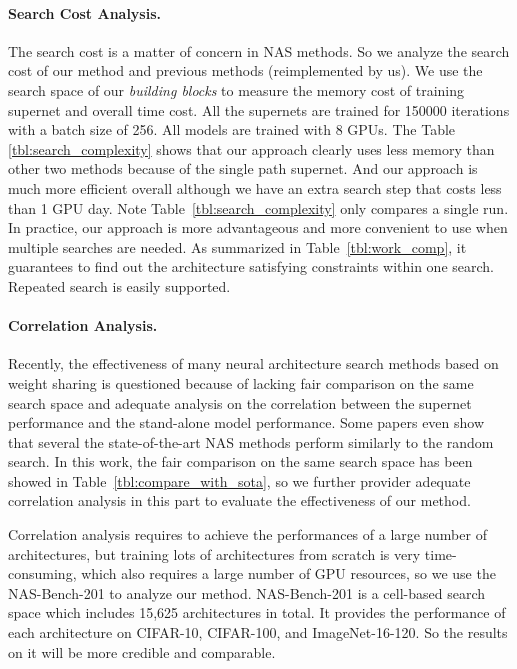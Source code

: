 \paragraph{Search Cost Analysis. } The search cost is a matter of concern in NAS methods. So we analyze the search cost of our method and previous methods \cite{wu2018fbnet,cai2018proxylessnas} (reimplemented by us). We use the search space of our \emph{building blocks} to measure the memory cost of training supernet and overall time cost. All the supernets are trained for 150000 iterations with a batch size of 256. All models are trained with 8 GPUs. The Table \ref{tbl:search_complexity} shows that our approach clearly uses less memory than other two methods because of the single path supernet. And our approach is much more efficient overall although we have an extra search step that costs less than 1 GPU day. Note Table~\ref{tbl:search_complexity} only compares a single run. In practice, our approach is more advantageous and more convenient to use when multiple searches are needed. As summarized in Table~\ref{tbl:work_comp}, it guarantees to find out the architecture satisfying constraints within one search. Repeated search is easily supported.

\paragraph{Correlation Analysis. }Recently, the effectiveness of many neural architecture search methods based on weight sharing is questioned because of lacking fair comparison on the same search space and adequate analysis on the correlation between the supernet performance and the stand-alone model performance. Some papers \cite{yang2019evaluation,xie2019exploring,sciuto2019evaluating} even show that several the state-of-the-art NAS methods perform similarly to the random search. In this work, the fair comparison on the same search space has been showed in Table~\ref{tbl:compare_with_sota}, so we further provider adequate correlation analysis in this part to evaluate the effectiveness of our method. 

Correlation analysis requires to achieve the performances of a large number of architectures, but training lots of architectures from scratch is very time-consuming, which also requires a large number of GPU resources, so we use the NAS-Bench-201 \cite{dong2020bench} to analyze our method. NAS-Bench-201 is a cell-based search space which includes 15,625 architectures in total. It provides the performance of each architecture on CIFAR-10, CIFAR-100, and ImageNet-16-120. So the results on it will be more credible and comparable.

